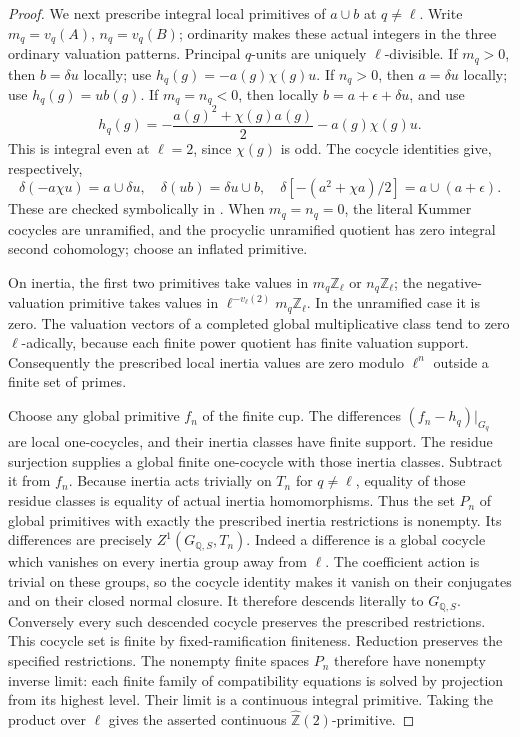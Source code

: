 \begin{proof}
We next prescribe integral local primitives of $a\cup b$ at
$q\ne\ell$. Write $m_q=v_q(A)$, $n_q=v_q(B)$; ordinarity makes
these actual integers in the three ordinary valuation patterns.
Principal $q$-units are uniquely $\ell$-divisible.
If $m_q>0$, then $b=\delta u$ locally; use
$h_q(g)=-a(g)\chi(g)u$.
If $n_q>0$, then $a=\delta u$ locally; use $h_q(g)=u b(g)$.
If $m_q=n_q<0$, then locally $b=a+\epsilon+\delta u$, and use
\[
 h_q(g)=-\frac{a(g)^2+\chi(g)a(g)}2-a(g)\chi(g)u.
\]
This is integral even at $\ell=2$, since $\chi(g)$ is odd.
The cocycle identities give, respectively,
\[
 \delta(-a\chi u)=a\cup\delta u,\quad
 \delta(ub)=\delta u\cup b,\quad
 \delta[-(a^2+\chi a)/2]=a\cup(a+\epsilon).
\]
These are checked symbolically in
. When $m_q=n_q=0$, the literal
Kummer cocycles are unramified, and the procyclic unramified quotient
has zero integral second cohomology; choose an inflated primitive.

On inertia, the first two primitives take values in
$m_q\mathbb Z_\ell$ or $n_q\mathbb Z_\ell$; the negative-valuation
primitive takes values in $\ell^{-v_\ell(2)}m_q\mathbb Z_\ell$.
In the unramified case it is zero. The valuation vectors of a completed
global multiplicative class tend to zero $\ell$-adically, because
each finite power quotient has finite valuation support. Consequently
the prescribed local inertia values are zero modulo $\ell^n$ outside
a finite set of primes.

Choose any global primitive $f_n$ of the finite cup. The differences
$(f_n-h_q)|_{G_q}$ are local one-cocycles, and their inertia classes
have finite support. The residue surjection supplies a global finite
one-cocycle with those inertia classes. Subtract it from $f_n$.
Because inertia acts trivially on $T_n$ for $q\ne\ell$, equality
of those residue classes is equality of actual inertia homomorphisms.
Thus the set $P_n$ of global primitives with exactly the prescribed
inertia restrictions is nonempty. Its differences are precisely
$Z^1(G_{\mathbb Q,S},T_n)$. Indeed a difference is a global cocycle
which vanishes on every inertia group away from $\ell$. The coefficient
action is trivial on these groups, so the cocycle identity makes it
vanish on their conjugates and on their closed normal closure. It
therefore descends literally to $G_{\mathbb Q,S}$. Conversely every
such descended cocycle preserves the prescribed restrictions. This
cocycle set is finite by fixed-ramification finiteness. Reduction
preserves the specified restrictions. The
nonempty finite spaces $P_n$ therefore have nonempty inverse limit:
each finite family of compatibility equations is solved by projection
from its highest level. Their limit is a continuous integral primitive.
Taking the product over $\ell$ gives the asserted continuous
$\widehat{\mathbb Z}(2)$-primitive.


\end{proof}
